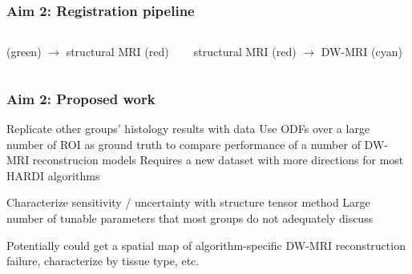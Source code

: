 \documentclass[presentation, 10pt]{beamer}
\begin{document}
\begin{frame}
  \frametitle{Aim 2: Registration pipeline}
  \begin{columns}
    \begin{column}{0.5\textwidth}
      \begin{center}
        \uct (green) $\rightarrow$ structural MRI (red)
        \vspace{1em}
      \end{center}
    \end{column}
    \begin{column}{0.5\textwidth}
      \begin{center}
        structural MRI (red) $\rightarrow$ DW-MRI (cyan)
        \vspace{1em}
      \end{center}
    \end{column}
  \end{columns}
\end{frame}

\begin{frame}
  \frametitle{Aim 2: Proposed work}
  \begin{outline}
  \1 Replicate other groups' histology results with \uct data
  \2 Use \uct ODFs over a large number of ROI as ground truth to compare
  performance of a number of DW-MRI reconstrucion models
  \2 Requires a new dataset with more directions for most HARDI algorithms

  \1 Characterize sensitivity / uncertainty with structure tensor method
  \2 Large number of tunable parameters that most groups do not adequately discuss

  \1 Potentially could get a spatial map of algorithm-specific DW-MRI reconstruction
  failure, characterize by tissue type, etc.
  \end{outline}
\end{frame}
\end{document}
